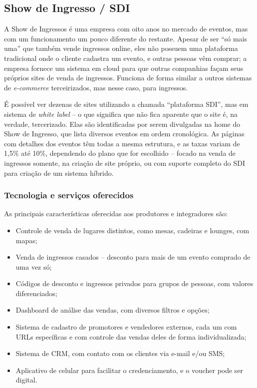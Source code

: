 \documentclass[12pt,a4paper,twoside,hyphens,english,brazil]{abntex2}
\begin{document}
\subsection{Show de Ingresso / SDI} \label{sec:concorrencia:sdi}
\label{sec:show-de-ingresso}
A Show de Ingressos é uma empresa com oito anos no mercado de eventos, mas com um funcionamento um pouco diferente do restante. Apesar de ser ``só mais uma'' que também vende ingressos online, eles não possuem uma plataforma tradicional onde o cliente cadastra um evento, e outras pessoas vêm comprar; a empresa fornece um sistema em cloud para que outras companhias façam seus próprios sites de venda de ingressos. Funciona de forma similar a outros sistemas de \emph{e-commerce} terceirizados, mas nesse caso, para ingressos.

É possível ver dezenas de sites utilizando a chamada ``plataforma SDI'', mas em sistema de \emph{white label} -- o que significa que não fica aparente que o site é, na verdade, tercerizado. Elas são identificadas por serem divulgadas na home do Show de Ingresso, que lista diversos eventos em ordem cronológica. As páginas com detalhes dos eventos têm todas a mesma estrutura, e as taxas variam de 1,5\% até 10\%, dependendo do plano que for escolhido -- focado na venda de ingressos somente, na criação de site próprio, ou com suporte completo do SDI para criação de um sistema híbrido.

\subsubsection*{Tecnologia e serviços oferecidos}
As principais características oferecidas aos produtores e integradores são:
\begin{itemize}[itemsep=-1ex]
	\item Controle de venda de lugares distintos, como mesas, cadeiras e lounges, com mapas;
	\item Venda de ingressos casados -- desconto para mais de um evento comprado de uma vez só;
	\item Códigos de desconto e ingressos privados para grupos de pessoas, com valores diferenciados;
	\item Dashboard de análise das vendas, com diversos filtros e opções;
	\item Sistema de cadastro de promotores e vendedores externos, cada um com URLs específicas e com controle das vendas deles de forma individualizada;
	\item Sistema de CRM, com contato com os clientes via e-mail e/ou SMS;
	\item Aplicativo de celular para facilitar o credenciamento, e o voucher pode ser digital.
\end{itemize}
\end{document}
